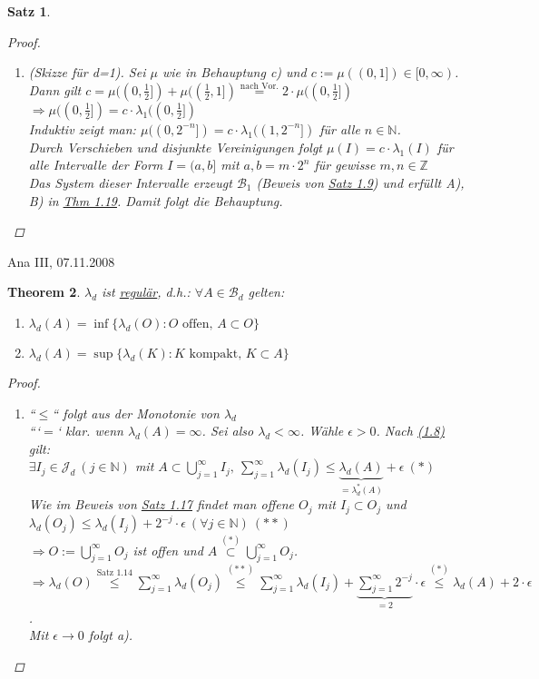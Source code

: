 \documentclass[a4paper]{scrreprt}
\newcommand{\N}{\mathbb{N}}
\newcommand{\Z}{\mathbb{Z}}
\newcommand{\Borel}{\mathcal{B}}
\newcommand{\Bd}{\Borel_d}
\newcommand{\Jd}{\mathcal{J}_d}
\newcommand{\jlabel}[1]{\label{j_#1}}
\newcommand{\jshortlink}[1]{\jhyperref{#1}{\text{#1}}}
\newcommand{\jhyperref}[2]{\hyperref[j_#1]{#2}}
\newcommand{\jlink}[1]{\jhyperref{#1}{#1}}
\newcommand{\jspacesmall}{\vspace{4pt}}
\newcommand{\jdate}[1]{\jspacesmall\begin{center}\jlabel{#1}\tiny{Ana III, #1}\end{center}}
\theoremstyle{plain}
\newtheorem{thm}{Theorem}[chapter]
\newtheorem{satz}[thm]{Satz}
\theoremstyle{definition}
\begin{document}
{{{\begin{satz}
\begin{proof}
\begin{enumerate}
            \item
                (Skizze für d=1). Sei $\mu$ wie in Behauptung c) und $c:= \mu((0,1])\in[0,\infty)$. Dann gilt $c = \mu((0, \frac{1}{2}]) + \mu((\frac{1}{2},1]) \overset{\text{nach Vor.}}{=} 2\cdot \mu((0,\frac{1}{2}])$\\
                $\Rightarrow \mu((0,\frac{1}{2}]) = c\cdot\lambda_1((0,\frac{1}{2}])$\\
                Induktiv zeigt man: $\mu((0,2^{-n}]) = c\cdot\lambda_1((1, 2^{-n}])$ für alle $n\in\N$.\\
                Durch Verschieben und disjunkte Vereinigungen folgt $\mu(I) = c\cdot \lambda_1(I)$ für alle Intervalle der Form $I=(a,b]$ mit $a,b = m\cdot 2^n$ für gewisse $m,n \in \Z$\\
                Das System dieser Intervalle erzeugt $\Borel_1$ (Beweis von \jlink{Satz 1.9}) und erfüllt A), B) in \jlink{Thm 1.19}. Damit folgt die Behauptung.
        \end{enumerate}
    \end{proof}
\end{satz}

\jdate{07.11.2008}

\begin{thm}
\jlabel{Thm 1.25}
    $\lambda_d$ ist \uline{regulär}, d.h.: $\forall A \in \Bd$ gelten:
    \begin{enumerate}
        \item $\lambda_d(A) = \inf \{ \lambda_d(O) : O \text{ offen, } A\subset  O\}$
        \item $\lambda_d(A) = \sup \{ \lambda_d(K) : K \text{ kompakt, } K\subset A\}$
    \end{enumerate}
    \begin{proof}
         \begin{enumerate}
             \item 
                ``$\le$`` folgt aus der Monotonie von $\lambda_d$\\
                ```$=$` klar. wenn $\lambda_d(A) = \infty$. Sei also $\lambda_d < \infty$. Wähle $\epsilon > 0$. Nach \jlink{(1.8)} gilt:\\
                $\exists I_j\in \Jd\ (j\in\N)$ mit $A \subset \bigcup_{j=1}^\infty I_j,\ \sum_{j=1}^\infty \lambda_d(I_j) \le \underbrace{\lambda_d(A)}_{= \lambda_d^*(A)} + \epsilon \ (*)$\\
                Wie im Beweis von \jlink{Satz 1.17} findet man offene $O_j$ mit $I_j \subset O_j$ und $\lambda_d(O_j) \le \lambda_d(I_j) + 2^{-j} \cdot \epsilon \ (\forall j\in \N) \ (**)$\\
                $\Rightarrow O := \bigcup_{j=1}^\infty O_j$ ist offen und $A \overset{(*)}{\subset} \bigcup_{j=1}^\infty O_j$.\\
                $\Rightarrow \lambda_d(O) \overset{\jshortlink{Satz 1.14}}{\le} \sum_{j=1}^\infty \lambda_d(O_j) \overset{(**)}{\le} \sum_{j=1}^\infty \lambda_d(I_j) + \underbrace{\sum_{j=1}^\infty 2^{-j}}_{= 2} \cdot \epsilon \overset{(*)}{\le} \lambda_d(A) + 2 \cdot \epsilon$.\\
                Mit $\epsilon \rightarrow 0$ folgt a).
                

\end{enumerate}
\end{proof}
\end{thm}}}}
\end{document}
